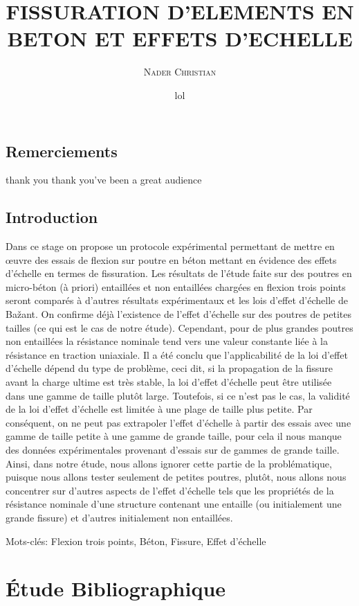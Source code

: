 \documentclass[12pt]{report}
\title{FISSURATION D'ELEMENTS EN BETON ET EFFETS D'ECHELLE}
\author{\textsc{Nader} \textsc{Christian}}
\date{lol}
\begin{document}
  
\maketitle %

\chapter*{Remerciements}
thank you thank you've been a great audience
 
\tableofcontents

\chapter*{Introduction}
Dans ce stage on propose un protocole expérimental permettant de mettre en œuvre des essais de
flexion sur poutre en béton mettant en évidence des effets d’échelle en termes de fissuration.
Les résultats de l’étude faite sur des poutres en micro-béton (à priori) entaillées et non entaillées
chargées en flexion trois points seront comparés à d’autres résultats expérimentaux et les lois
d'effet d’échelle de Bažant. On confirme déjà l’existence de l’effet d’échelle sur des poutres de
petites tailles (ce qui est le cas de notre étude). Cependant, pour de plus grandes poutres non
entaillées la résistance nominale tend vers une valeur constante liée à la résistance en traction
uniaxiale. Il a été conclu que l'applicabilité de la loi d’effet d’échelle dépend du type de
problème, ceci dit, si la propagation de la fissure avant la charge ultime est très stable, la loi
d’effet d’échelle peut être utilisée dans une gamme de taille plutôt large. Toutefois, si ce n'est pas
le cas, la validité de la loi d’effet d’échelle est limitée à une plage de taille plus petite. Par
conséquent, on ne peut pas extrapoler l'effet d’échelle à partir des essais avec une gamme de
taille petite à une gamme de grande taille, pour cela il nous manque des données expérimentales
provenant d’essais sur de gammes de grande taille. Ainsi, dans notre étude, nous allons ignorer
cette partie de la problématique, puisque nous allons tester seulement de petites poutres, plutôt,
nous allons nous concentrer sur d'autres aspects de l’effet d’échelle tels que les propriétés de la
résistance nominale d’une structure contenant une entaille (ou initialement une grande fissure) et
d’autres initialement non entaillées.


Mots-clés: Flexion trois points, Béton, Fissure, Effet d’échelle


\part{Étude Bibliographique}
\end{document}

